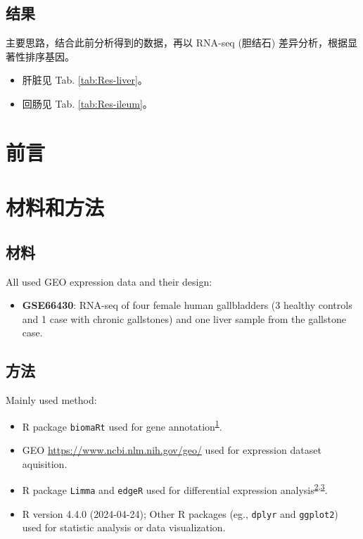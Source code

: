\documentclass[
]{article}
\providecommand{\tightlist}{%
  \setlength{\itemsep}{0pt}\setlength{\parskip}{0pt}}
\begin{document}
\hypertarget{ux7ed3ux679c}{%
\subsection{结果}\label{ux7ed3ux679c}}

主要思路，结合此前分析得到的数据，再以 RNA-seq (胆结石) 差异分析，根据显著性排序基因。

\begin{itemize}
\tightlist
\item
  肝脏见 Tab. \ref{tab:Res-liver}。
\item
  回肠见 Tab. \ref{tab:Res-ileum}。
\end{itemize}

\hypertarget{introduction}{%
\section{前言}\label{introduction}}

\hypertarget{methods}{%
\section{材料和方法}\label{methods}}

\hypertarget{ux6750ux6599}{%
\subsection{材料}\label{ux6750ux6599}}

All used GEO expression data and their design:

\begin{itemize}
\tightlist
\item
  \textbf{GSE66430}: RNA-seq of four female human gallbladders (3 healthy controls and 1 case with chronic gallstones) and one liver sample from the gallstone case.
\end{itemize}

\hypertarget{ux65b9ux6cd5}{%
\subsection{方法}\label{ux65b9ux6cd5}}

Mainly used method:

\begin{itemize}
\tightlist
\item
  R package \texttt{biomaRt} used for gene annotation\textsuperscript{\protect\hyperlink{ref-MappingIdentifDurinc2009}{1}}.
\item
  GEO \url{https://www.ncbi.nlm.nih.gov/geo/} used for expression dataset aquisition.
\item
  R package \texttt{Limma} and \texttt{edgeR} used for differential expression analysis\textsuperscript{\protect\hyperlink{ref-LimmaPowersDiRitchi2015}{2},\protect\hyperlink{ref-EdgerDifferenChen}{3}}.
\item
  R version 4.4.0 (2024-04-24); Other R packages (eg., \texttt{dplyr} and \texttt{ggplot2}) used for statistic analysis or data visualization.
\end{itemize}
\end{document}
